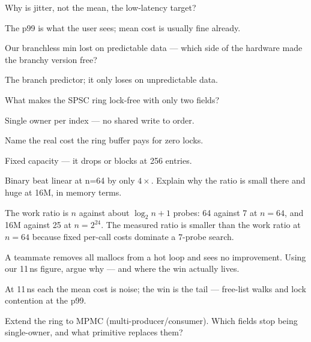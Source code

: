 \begin{exercise}[easy]
Why is jitter, not the mean, the low-latency target?
\end{exercise}
\begin{solution}[hint]
The p99 is what the user sees; mean cost is usually fine already.
\end{solution}
\begin{exercise}[easy]
Our branchless min lost on predictable data --- which side of
the hardware made the branchy version free?
\end{exercise}
\begin{solution}[hint]
The branch predictor; it only loses on unpredictable data.
\end{solution}
\begin{exercise}[easy]
What makes the SPSC ring lock-free with only two fields?
\end{exercise}
\begin{solution}[hint]
Single owner per index --- no shared write to order.
\end{solution}
\begin{exercise}[easy]
Name the real cost the ring buffer pays for zero locks.
\end{exercise}
\begin{solution}[hint]
Fixed capacity --- it drops or blocks at 256 entries.
\end{solution}
\begin{exercise}[medium]
Binary beat linear at n=64 by only $4\times$. Explain why the
ratio is small there and huge at 16M, in memory terms.
\end{exercise}
\begin{solution}[hint]
The work ratio is $n$ against about $\log_2 n+1$ probes: 64 against 7
at $n=64$, and 16M against 25 at $n=2^{24}$. The measured ratio is smaller than the
work ratio at $n=64$ because fixed per-call costs dominate a 7-probe search.
\end{solution}
\begin{exercise}[medium]
A teammate removes all mallocs from a hot loop and sees no
improvement. Using our 11\,ns figure, argue why --- and where the
win actually lives.
\end{exercise}
\begin{solution}[hint]
At 11\,ns each the mean cost is noise; the win is the tail ---
free-list walks and lock contention at the p99.
\end{solution}
\begin{exercise}[medium]
Extend the ring to MPMC (multi-producer/consumer). Which fields
stop being single-owner, and what primitive replaces them?
\end{exercise}
